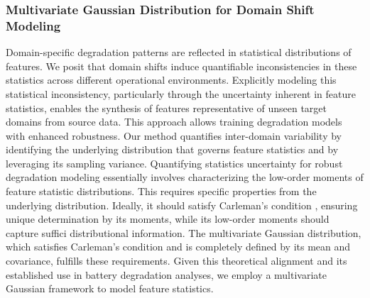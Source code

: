 \documentclass[lettersize,journal]{IEEEtran}
\begin{document}
\subsubsection{Multivariate Gaussian Distribution for Domain Shift Modeling}

Domain-specific degradation patterns are reflected in statistical distributions of features. We posit that domain shifts induce quantifiable inconsistencies in these statistics across different operational environments. Explicitly modeling this statistical inconsistency, particularly through the uncertainty inherent in feature statistics, enables the synthesis of features representative of unseen target domains from source data. This approach allows training degradation models with enhanced robustness.
Our method quantifies inter-domain variability by identifying the underlying distribution that governs feature statistics and by leveraging its sampling variance.
% 
Quantifying statistics uncertainty for robust degradation modeling essentially involves characterizing the low-order moments of feature statistic distributions.
This requires specific properties from the underlying distribution.
Ideally, it should satisfy Carleman's condition \cite{akhiezer2020classical}, ensuring unique determination by its moments, while its low-order moments should capture suffici distributional information. The multivariate Gaussian distribution, which satisfies Carleman's condition and is completely defined by its mean and covariance, fulfills these requirements. Given this theoretical alignment and its established use in battery degradation analyses, we employ a multivariate Gaussian framework to model feature statistics.
\end{document}
